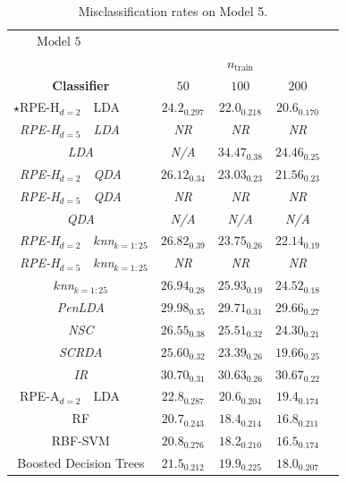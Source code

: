 \documentclass{amsart}
\providecommand{\tabularnewline}{\\}
\begin{document}
\begin{table}[p]
	\begin{centering}
		\begin{tabular}{r|l|c|c|c|c}
			\multicolumn{1}{r}{$\boxed{\text{Model 5}}$} & \multicolumn{1}{l}{} & \multicolumn{3}{c}{} & \tabularnewline
			\multicolumn{1}{r}{} &  & \multicolumn{3}{c|}{$n_{\mathrm{train}}$} & \tabularnewline
			\multicolumn{2}{c|}{\textbf{Classifier}} & $50$ & $100$ & $200$ & \tabularnewline
			\hline 
			$\star$RPE-H$_{d=2}$ & LDA & $24.2_{0.297}$ & $22.0_{0.218}$ & $20.6_{0.170}$ & \tabularnewline
			\hline 
			\emph{RPE-H$_{d=5}$} & \emph{LDA} & \emph{NR} & \emph{NR} & \emph{NR} & \tabularnewline
			\hline 
			\multicolumn{2}{c|}{\emph{LDA}} & \emph{N/A} & $\mathit{34.47_{0.38}}$ & $\mathit{24.46_{0.25}}$ & \tabularnewline
			\hline 
			\emph{RPE-H$_{d=2}$} & \emph{QDA} & $\mathit{26.12_{0.34}}$ & $\mathit{23.03_{0.23}}$ & $\mathit{21.56_{0.23}}$ & \tabularnewline
			\hline 
			\emph{RPE-H$_{d=5}$} & \emph{QDA} & \emph{NR} & \emph{NR} & \emph{NR} & \tabularnewline
			\hline 
			\multicolumn{2}{c|}{\emph{QDA}} & \emph{N/A} & \emph{N/A} & \emph{N/A} & \tabularnewline
			\hline 
			\emph{RPE-H$_{d=2}$} & \emph{$k$nn$_{k=1:25}$} & $\mathit{26.82_{0.39}}$ & $\mathit{23.75_{0.26}}$ & $\mathit{22.14_{0.19}}$ & \tabularnewline
			\hline 
			\emph{RPE-H$_{d=5}$} & \emph{$k$nn$_{k=1:25}$} & \emph{NR} & \emph{NR} & \emph{NR} & \tabularnewline
			\hline 
			\multicolumn{2}{c|}{\emph{$k$nn$_{k=1:25}$}} & $\mathit{26.94_{0.28}}$ & $\mathit{25.93_{0.19}}$ & $\mathit{24.52_{0.18}}$ & \tabularnewline
			\hline 
			\hline 
			\multicolumn{2}{c|}{\emph{PenLDA}} & $\mathit{29.98_{0.35}}$ & $\mathit{29.71_{0.31}}$ & $\mathit{29.66_{0.27}}$ & \tabularnewline
			\hline 
			\multicolumn{2}{c|}{\emph{NSC}} & $\mathit{26.55_{0.38}}$ & $\mathit{25.51_{0.32}}$ & $\mathit{24.30_{0.21}}$ & \tabularnewline
			\hline 
			\multicolumn{2}{c|}{\emph{SCRDA}} & $\mathit{25.60_{0.32}}$ & $\mathit{23.39_{0.26}}$ & $\mathit{19.66_{0.25}}$ & \tabularnewline
			\hline 
			\multicolumn{2}{c|}{\emph{IR}} & $\mathit{30.70_{0.31}}$ & $\mathit{30.63_{0.26}}$ & $\mathit{30.67_{0.22}}$ & \tabularnewline
			\hline 
			\hline 
			RPE-A$_{d=2}$ & LDA & $22.8_{0.287}$ & $20.6_{0.204}$ & $19.4_{0.174}$ & \tabularnewline
			\hline 
			\hline 
			\multicolumn{2}{c|}{RF} & $\mathbf{20.7_{0.243}}$ & $18.4_{0.214}$ & $16.8_{0.211}$ & \tabularnewline
			\hline 
			\multicolumn{2}{c|}{RBF-SVM} & $20.8_{0.276}$ & $\mathbf{18.2_{0.210}}$ & $\mathbf{16.5_{0.174}}$ & \tabularnewline
			\hline 
			\multicolumn{2}{c|}{Boosted Decision Trees} & $21.5_{0.212}$ & $19.9_{0.225}$ & $18.0_{0.207}$ & \tabularnewline
		\end{tabular}\\
		
		\par\end{centering}
	
	\protect\caption{Misclassification rates on Model 5.}
	\label{tab:model-5}
\end{table}




\clearpage %






\newpage


\end{document}
